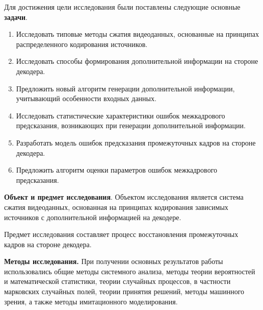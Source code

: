 Для достижения цели исследования были поставлены следующие основные \textbf{задачи}.
\begin{enumerate}
\item Исследовать типовые методы сжатия видеоданных, основанные на принципах распределенного кодирования источников.
\item Исследовать способы формирования дополнительной информации на стороне декодера.
\item Предложить новый алгоритм генерации дополнительной информации, учитывающий особенности входных данных.
\item Исследовать статистические характеристики ошибок межкадрового предсказания, возникающих при генерации дополнительной информации.
\item Разработать модель ошибок предсказания промежуточных кадров на стороне декодера.
\item Предложить алгоритм оценки параметров ошибок межкадрового предсказания.
\end{enumerate}

\textbf{Объект и предмет исследования}. Объектом исследования является система сжатия видеоданных, основанная на принципах кодирования зависимых источников с дополнительной информацией на декодере.

Предмет исследования составляет процесс восстановления промежуточных кадров на стороне декодера.

\textbf{Методы исследования.} При получении основных результатов работы использовались общие методы системного анализа, методы теории вероятностей и математической статистики, теории случайных процессов, в частности марковских случайных полей, теории принятия решений, методы машинного зрения, а также методы имитационного моделирования.


